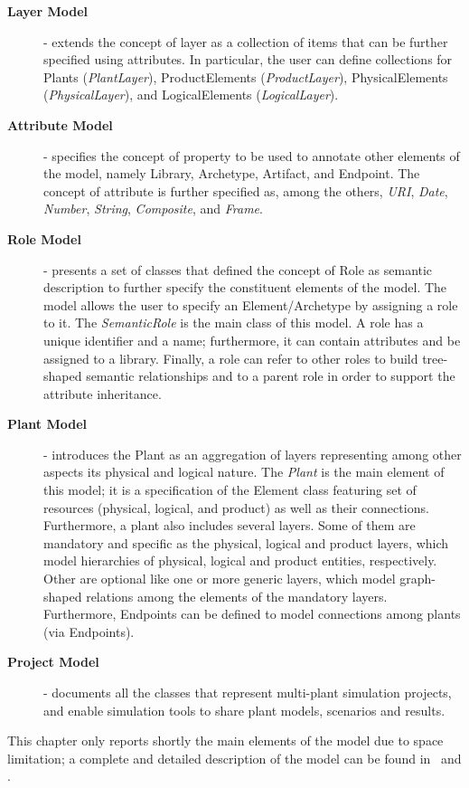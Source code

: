 \begin{description}
\item[\textbf{Layer Model}] -  extends the concept of layer as a collection of items that can be further specified using attributes. In particular, the user can define collections for Plants (\textit{PlantLayer}), ProductElements (\textit{ProductLayer}), PhysicalElements (\textit{PhysicalLayer}), and LogicalElements (\textit{LogicalLayer}).
	\item[\textbf{Attribute Model}] - specifies the concept of property to be used to annotate other elements of the model, namely Library, Archetype, Artifact, and Endpoint. The concept of attribute is further specified as, among the others, \textit{URI}, \textit{Date}, \textit{Number}, \textit{String}, \textit{Composite}, and \textit{Frame}.
	\item[\textbf{Role Model}] - presents a set of classes that defined the concept of Role as semantic description to further specify the constituent elements of the model. The model allows the user to specify an Element/Archetype by assigning a role to it. The \textit{SemanticRole} is the main class of this model. A role has a unique identifier and a name; furthermore, it can contain attributes and be assigned to a library. Finally, a role can refer to other roles to build tree-shaped semantic relationships and to a parent role in order to support the attribute inheritance.
     	\item[\textbf{Plant Model}] - introduces the Plant as an aggregation of layers representing among other aspects its physical and logical nature.  The \textit{Plant} is the main element of this model; it is a specification of the Element class featuring set of resources (physical, logical, and product) as well as their connections. 
Furthermore, a plant also includes several layers. 
Some of them are mandatory and specific as the physical, logical and product layers, which model hierarchies of physical, logical and product entities, respectively.  Other are optional like one or more generic layers, which model graph-shaped relations among the elements of the mandatory layers. Furthermore, Endpoints can be defined to model connections among plants (via Endpoints).
	\item[\textbf{Project Model}] - documents all the classes that represent multi-plant simulation projects, and enable simulation tools to share plant models, scenarios and results.  
\end{description}

This chapter only reports shortly the main elements of the model due to space limitation; a complete and detailed description of the model can be found in~\cite{Ciavotta2018} and \cite{FAR-EDGE41}.

